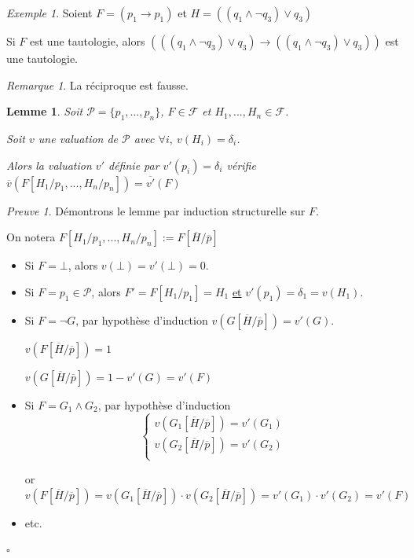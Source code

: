 \documentclass[]{article}
\newtheorem{mylemma}{Lemme}
\theoremstyle{remark}
\newtheorem{myrem}{Remarque}
\newtheorem{myproof}{Preuve}
\newtheorem{myexmpl}{Exemple}
\theoremstyle{definition}
\newcommand{\cqfd}{
	\hfill$\square$
}
\begin{document}
\begin{myexmpl}
	Soient $F = (p_1 \longrightarrow p_1)$ et $H=((q_1 \land \neg q_3) \lor q_3)$
	
	Si $F$ est une tautologie, alors $(((q_1 \land \neg q_3) \lor q_3) \longrightarrow ((q_1 \land \neg q_3) \lor q_3))$ est une tautologie.
\end{myexmpl}

\begin{myrem}
	La réciproque est fausse.
\end{myrem}

\begin{mylemma}
	Soit $\mathcal{P}=\{p_1, ..., p_n\}$, $F \in \mathcal{F}$ et $H_1,..., H_n \in \mathcal{F}$.
	
	Soit $v$ une valuation de $\mathcal{P}$ avec $\forall i, ~ v(H_i)=\delta_i$. 
	
	Alors la valuation $v'$ définie par $v'(p_i)=\delta_i$ vérifie $\overline{v}(F[H_1/p_1,...,H_n/p_n])=\overline{v'}(F)$
\end{mylemma}

\begin{myproof}
	Démontrons le lemme par induction structurelle sur $F$.
	
	On notera $F[H_1/p_1, ..., H_n/p_n]:=F[\overline{H}/\overline{p}]$
	
	\begin{itemize}
		\item Si $F = \bot$, alors $v(\bot)=v'(\bot)=0$.
		
		\item Si $F=p_1 \in \mathcal{P}$, alors $F'=F[H_1/p_1]=H_1$ \underline{et} $v'(p_1)=\delta_1=v(H_1)$.
		
		\item Si $F=\neg G$, par hypothèse d'induction $v(G[\overline{H}/\overline{p}])=v'(G)$.
		
		$v(F[\overline{H}/\overline{p}])=1$
		
		$v(G[\overline{H}/\overline{p}])=1 - v'(G) = v'(F)$
		
		\item Si $F=G_1 \land G_2$, par hypothèse d'induction
		$$
			\left\{
			\begin{array}{l}
				v(G_1[\overline{H}/\overline{p}])=v'(G_1) \\
				v(G_2[\overline{H}/\overline{p}])=v'(G_2) \\
			\end{array}
			\right.
		$$
		
		or $v(F[\overline{H}/\overline{p}])=v(G_1[\overline{H}/\overline{p}]) \cdot v(G_2[\overline{H}/\overline{p}]) = v'(G_1) \cdot v'(G_2)=v'(F)$
		
		\item etc.
	\end{itemize}
	\cqfd
\end{myproof}
\end{document}

